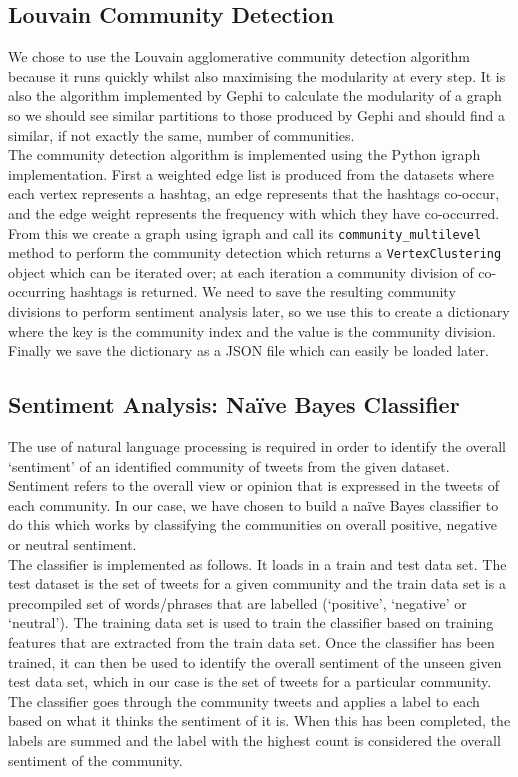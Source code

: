 \documentclass[conference]{IEEEtran}
\begin{document}
	\subsection{Louvain Community Detection}
		{
			We chose to use the Louvain agglomerative community detection algorithm \cite{louvain} because it runs quickly whilst also maximising the modularity at every step. It is also the algorithm implemented by Gephi to calculate the modularity of a graph so we should see similar partitions to those produced by Gephi and should find a similar, if not exactly the same, number of communities. \\
			
			The community detection algorithm is implemented using the Python igraph \cite{igraph} implementation. First a weighted edge list is produced from the datasets where each vertex represents a hashtag, an edge represents that the hashtags co-occur, and the edge weight represents the frequency with which they have co-occurred. From this we create a graph using igraph and call its \texttt{community\_multilevel} method to perform the community detection which returns a \texttt{VertexClustering} object which can be iterated over; at each iteration a community division of co-occurring hashtags is returned. We need to save the resulting community divisions to perform sentiment analysis later, so we use this to create a dictionary where the key is the community index and the value is the community division. Finally we save the dictionary as a JSON file which can easily be loaded later.
		\par}
	
	\subsection{Sentiment Analysis: Naïve Bayes Classifier}
		{
			The use of natural language processing is required in order to identify the overall ‘sentiment’ of an identified community of tweets from the given dataset. Sentiment refers to the overall view or opinion that is expressed in the tweets of each community. In our case, we have chosen to build a naïve Bayes classifier to do this which works by classifying the communities on overall positive, negative or neutral sentiment. \\
			
The classifier is implemented as follows. It loads in a train and test data set. The test dataset is the set of tweets for a given community and the train data set is a precompiled set of words/phrases that are labelled (‘positive’, ‘negative’ or ‘neutral’). The training data set is used to train the classifier based on training features that are extracted from the train data set. Once the classifier has been trained, it can then be used to identify the overall sentiment of the unseen given test data set, which in our case is the set of tweets for a particular community. The classifier goes through the community tweets and applies a label to each based on what it thinks the sentiment of it is. When this has been completed, the labels are summed and the label with the highest count is considered the overall sentiment of the community.
		\par}
		
\end{document}
